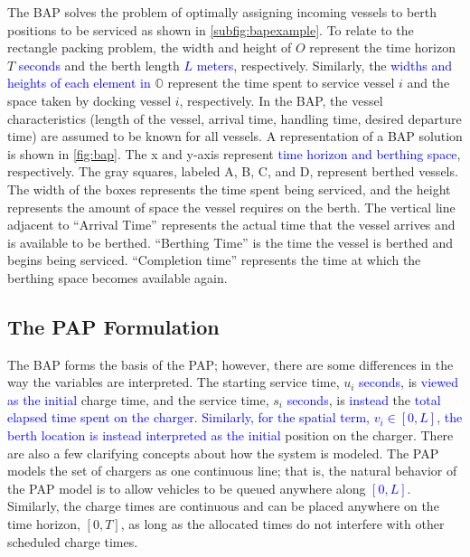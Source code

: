 \documentclass[utf8]{FrontiersinHarvard}
\begin{document}
The BAP solves the problem of optimally assigning incoming vessels to berth positions to be serviced as shown in
\autoref{subfig:bapexample}. To relate to the rectangle packing problem, the width and height of \(O\) represent the time
horizon \(T\) \textcolor{blue}{seconds} and the berth length \textcolor{blue}{$L$ meters}, respectively. Similarly, the
\textcolor{blue}{widths and heights of each element in} \(\mathbb{O}\) represent the time spent to service
vessel \(i\) and the space taken by docking vessel \(i\), respectively. In the BAP, the vessel characteristics (length of
the vessel, arrival time, handling time, desired departure time) are assumed to be known for all vessels. A
representation of a BAP solution is shown in \autoref{fig:bap}. The x and y-axis represent
\textcolor{blue}{time horizon and berthing space}, respectively. The gray squares, labeled A, B, C, and D,
represent berthed vessels. The width of the boxes represents the time spent being serviced, and the height represents
the amount of space the vessel requires on the berth. The vertical line adjacent to ``Arrival Time'' represents the
actual time that the vessel arrives and is available to be berthed. ``Berthing Time'' is the time the vessel is berthed
and begins being serviced. ``Completion time'' represents the time at which the berthing space becomes available again.

\subsection{The PAP Formulation}
\label{sec:the-pap-formulation}
The BAP forms the basis of the PAP; however, there are some differences in the way the variables are interpreted. The
starting service time, \(u_i\) \textcolor{blue}{seconds}, is \textcolor{blue}{viewed as the initial}
charge time, and the service time, \(s_i\) \textcolor{blue}{seconds}, is \textcolor{blue}{instead}
the \textcolor{blue}{total elapsed time spent on the charger}. \textcolor{blue}{Similarly, for the spatial term, $v_i \in [0,L]$, the berth location is instead interpreted as the initial} position on the charger. There
are also a few clarifying concepts about how the system is modeled. The PAP models the set of chargers as one continuous
line; that is, the natural behavior of the PAP model is to allow vehicles to be queued anywhere along
\textcolor{blue}{$[0,L]$}. Similarly, the charge times are continuous and can be placed anywhere on the time horizon,
\([0,T]\), as long as the allocated times do not interfere with other scheduled charge times.
\end{document}
